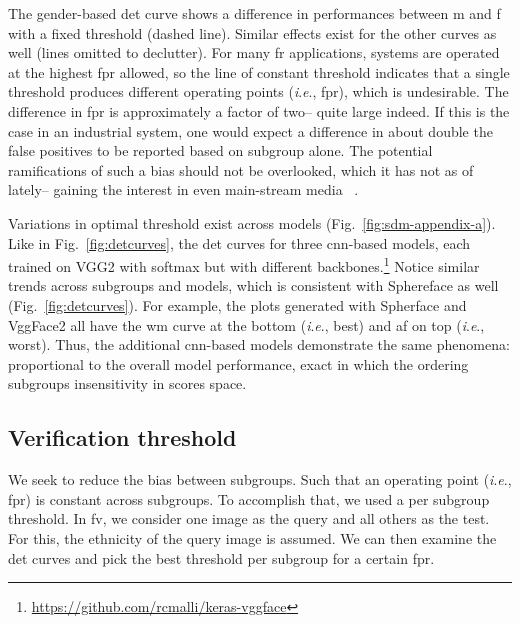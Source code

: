 \documentclass[10pt,twocolumn,letterpaper]{article}
\newcommand{\ie}{\textit{i}.\textit{e}., }
\begin{document}
The gender-based \gls{det} curve shows a difference in performances between \gls{m} and \gls{f} with a fixed threshold (dashed line). Similar effects exist for the other curves as well (lines omitted to declutter). For many \gls{fr} applications, systems are operated at the highest \gls{fpr} allowed, so the line of constant threshold indicates that a single threshold produces different operating points (\ie \gls{fpr}), which is undesirable.  The difference in \gls{fpr} is approximately a factor of two-- quite large indeed. If this is the case in an industrial system, one would expect a difference in about double the false positives to be reported based on subgroup alone. The potential ramifications of such a bias should not be overlooked, which it has not as of lately-- gaining the interest in even main-stream media ~\cite{england2019,snow2018}.

Variations in optimal threshold exist across models (Fig.~\ref{fig:sdm-appendix-a}). Like in Fig.~\ref{fig:detcurves}, the \gls{det} curves for three \gls{cnn}-based models, each trained on VGG2 with softmax but with different backbones.\footnote{\href{https://github.com/rcmalli/keras-vggface}{https://github.com/rcmalli/keras-vggface}} Notice similar trends across subgroups and models, which is consistent with  Sphereface as well (Fig.~\ref{fig:detcurves}). For example, the plots generated with Spherface and VggFace2 all have the \gls{wm} curve at the bottom (\ie best) and \gls{af} on top (\ie worst). Thus, the additional \gls{cnn}-based models demonstrate the same phenomena: proportional to the overall model performance, exact in which the ordering subgroups insensitivity in scores space.

\subsection{Verification threshold} \label{subsec:analysis:verification}
We seek to reduce the bias between subgroups. Such that an operating point (\ie \gls{fpr}) is constant across subgroups. To accomplish that, we used a per subgroup threshold. In \gls{fv}, we consider one image as the query and all others as the test. For this, the ethnicity of the query image is assumed. We can then examine the \gls{det} curves and pick the best threshold per subgroup for a certain \gls{fpr}.
\end{document}

